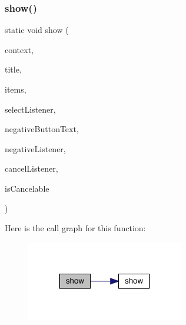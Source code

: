 \subsubsection{\texorpdfstring{show()}{show()}\hspace{0.1cm}{\footnotesize\ttfamily [2/3]}}
{\footnotesize\ttfamily static void show (\begin{DoxyParamCaption}\item[{@Non\+Null final Context}]{context,  }\item[{@Non\+Null final String}]{title,  }\item[{@Non\+Null final List$<$ String $>$}]{items,  }\item[{@Nullable final Dialog\+Interface.\+On\+Click\+Listener}]{select\+Listener,  }\item[{@Nullable final String}]{negative\+Button\+Text,  }\item[{@Nullable final Dialog\+Interface.\+On\+Click\+Listener}]{negative\+Listener,  }\item[{@Nullable final Dialog\+Interface.\+On\+Cancel\+Listener}]{cancel\+Listener,  }\item[{final boolean}]{is\+Cancelable }\end{DoxyParamCaption})\hspace{0.3cm}{\ttfamily [static]}}

Here is the call graph for this function\+:
\nopagebreak
\begin{figure}[H]
\begin{center}
\leavevmode
\includegraphics[width=195pt]{classcom_1_1toast_1_1android_1_1gamebase_1_1base_1_1ui_1_1_simple_select_item_dialog_a453bc4d484f85949532ce8198bd9e9de_cgraph}
\end{center}
\end{figure}
\mbox{\label{classcom_1_1toast_1_1android_1_1gamebase_1_1base_1_1ui_1_1_simple_select_item_dialog_af317da597de0a837b13a021f5ced8b4f}} 
